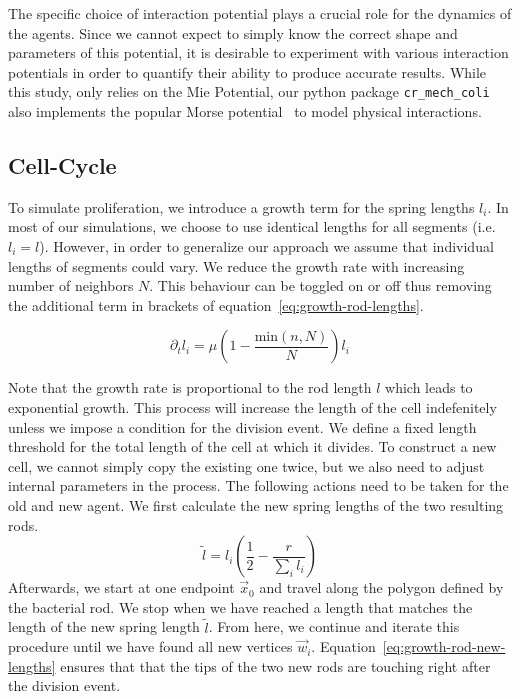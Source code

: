 \documentclass{article}
\begin{document}
The specific choice of interaction potential plays a crucial role for the dynamics of the agents.
Since we cannot expect to simply know the correct shape and parameters of this potential, it is
desirable to experiment with various interaction potentials in order to quantify their
ability to produce accurate results.
While this study, only relies on the Mie Potential, our python package \texttt{cr\_mech\_coli}
also implements the popular Morse potential~\cite{Morse1929} to model physical interactions.

\subsection{Cell-Cycle}

To simulate proliferation, we introduce a growth term for the spring lengths $l_i$.
In most of our simulations, we choose to use identical lengths for all segments (i.e. $l_i=l$).
However, in order to generalize our approach we assume that individual lengths of segments could
vary.
We reduce the growth rate with increasing number of neighbors $N$.
This behaviour can be toggled on or off thus removing the additional term in brackets of
equation~\ref{eq:growth-rod-lengths}.

\begin{equation}
    \partial_t l_i = \mu\left(1-\frac{\text{min}(n,N)}{N}\right)l_i
    \label{eq:growth-rod-lengths}
\end{equation}

Note that the growth rate is proportional to the rod length $l$ which leads to exponential growth.
This process will increase the length of the cell indefenitely unless we impose a condition for the
division event.
We define a fixed length threshold for the total length of the cell at which it divides.
To construct a new cell, we cannot simply copy the existing one twice, but we also need to adjust
internal parameters in the process.
The following actions need to be taken for the old and new agent.
We first calculate the new spring lengths of the two resulting rods.
\begin{equation}
    \tilde{l} = l_i\left(\frac{1}{2} - \frac{r}{\sum\limits_i l_i}\right)
    \label{eq:growth-rod-new-lengths}
\end{equation}
Afterwards, we start at one endpoint $\vec{x}_0$ and travel along the polygon defined by the
bacterial rod.
We stop when we have reached a length that matches the length of the new spring length $\tilde{l}$.
From here, we continue and iterate this procedure until we have found all new vertices $\vec{w}_i$.
Equation~\ref{eq:growth-rod-new-lengths} ensures that that the tips of the two new rods are touching
right after the division event.
\end{document}
